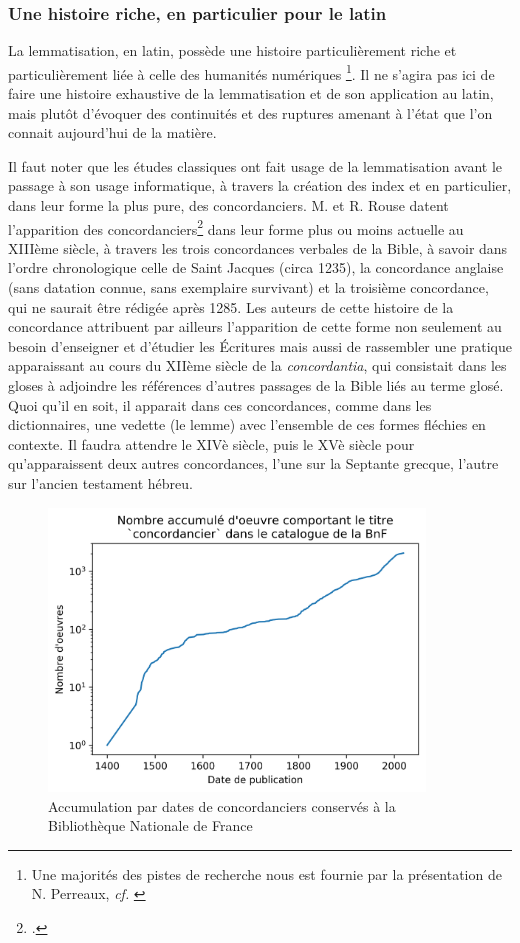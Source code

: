 \subsubsection{Une histoire riche, en particulier pour le latin}

La lemmatisation, en latin, possède une histoire particulièrement riche et particulièrement liée à celle des humanités numériques \footnote{Une majorités des pistes de recherche nous est fournie par la présentation de N. Perreaux, \textit{cf.} \cite{perreaux_lemmatisation_2019}}. Il ne s'agira pas ici de faire une histoire exhaustive de la lemmatisation et de son application au latin, mais plutôt d'évoquer des continuités et des ruptures amenant à l'état que l'on connait aujourd'hui de la matière.

Il faut noter que les études classiques ont fait usage de la lemmatisation avant le passage à son usage informatique, à travers la création des index et en particulier, dans leur forme la plus pure, des concordanciers. M. et R. Rouse datent l'apparition des concordanciers\footcite{rouse_concordance_1984} dans leur forme plus ou moins actuelle au XIIIème siècle, à travers les trois concordances verbales de la Bible, à savoir dans l'ordre chronologique celle de Saint Jacques (circa 1235), la concordance anglaise (sans datation connue, sans exemplaire survivant) et la troisième concordance, qui ne saurait être rédigée après 1285. Les auteurs de cette histoire de la concordance attribuent par ailleurs l'apparition de cette forme non seulement au besoin d'enseigner et d'étudier les Écritures mais aussi de rassembler une pratique apparaissant au cours du XIIème siècle de la \textit{concordantia}, qui consistait dans les gloses à adjoindre les références d'autres passages de la Bible liés au terme glosé. Quoi qu'il en soit, il apparait dans ces concordances, comme dans les dictionnaires, une vedette (le lemme) avec l'ensemble de ces formes fléchies en contexte. Il faudra attendre le XIVè siècle, puis le XVè siècle pour qu'apparaissent deux autres concordances, l'une sur la Septante grecque, l'autre sur l'ancien testament hébreu.

\begin{figure}[h]
    \centering
    \includegraphics[width=10cm]{results/lemmatisation/histoire/concordanciers.png}
    \caption{Accumulation par dates de concordanciers conservés à la Bibliothèque Nationale de France}
    \label{lemmatisation:concordanciers}
\end{figure}


